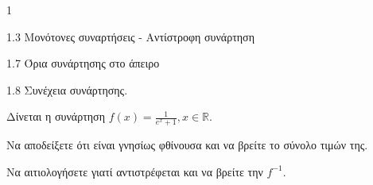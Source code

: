 \begin{ylh}{1}
    \item 1.3 Μονότονες συναρτήσεις - Αντίστροφη συνάρτηση
    \item 1.7 Όρια συνάρτησης στο άπειρο
    \item 1.8 Συνέχεια συνάρτησης.
\end{ylh}
Δίνεται η συνάρτηση $f(x)=\frac{1}{e^x+1}, x \in \mathbb{R}$.
\begin{alist}
\item Να αποδείξετε ότι είναι γνησίως φθίνουσα και να βρείτε το σύνολο τιμών της. 
\item Να αιτιολογήσετε γιατί αντιστρέφεται και να βρείτε την $f^{-1}$. 
\end{alist}